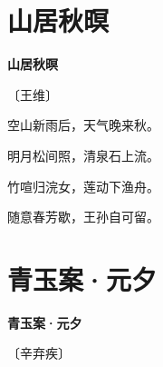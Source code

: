 \documentclass[12pt,UTF-8,openany,fontset=none]{ctexbook}
\begin{document}
\vspace{8pt}
\clearpage

\section{山居秋暝}


\begin{center}
    {\bfseries 山居秋暝}

    \vspace{18pt}

    \begin{large}\xuwen
        〔王维〕
    \end{large}

\end{center}

    \vspace{18pt}  %

\begin{center}
    \begin{Large}

        空山新雨后，天气晚来秋。

        明月松间照，清泉石上流。

        竹喧归浣女，莲动下渔舟。

        随意春芳歇，王孙自可留。

    \end{Large}

\end{center}

\vspace{8pt}
\clearpage

\section{青玉案·元夕}


\begin{center}
    {\bfseries 青玉案·元夕}

    \vspace{18pt}

    \begin{large}\xuwen
        〔辛弃疾〕
    \end{large}

\end{center}

    \vspace{18pt}  %
\end{document}
